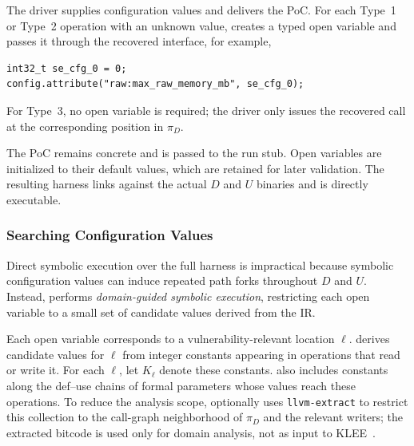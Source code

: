 The driver supplies configuration values and delivers the PoC. For each Type~1 or Type~2 operation with an unknown value, \sys creates a typed open variable and passes it through the recovered interface, for example,
\begin{verbatim}
int32_t se_cfg_0 = 0;
config.attribute("raw:max_raw_memory_mb", se_cfg_0);
\end{verbatim}

For Type~3, no open variable is required; the driver only issues the recovered call at the corresponding position in $\pi_D$. 

The PoC remains concrete and is
passed to the run stub. Open variables are initialized to their default values, which are retained for later validation. The resulting harness links against the actual $D$ and $U$ binaries and is directly executable.


\subsubsection{Searching Configuration Values}\label{subsubsec:confvalue}
Direct symbolic execution over the full harness is impractical because symbolic configuration values can induce repeated path forks throughout $D$ and $U$. Instead, \sys performs \textit{domain-guided symbolic execution}, restricting each open variable to a small set of candidate
values derived from the IR.

Each open variable corresponds to a vulnerability-relevant location $\ell$. \sys derives candidate values for $\ell$ from integer constants appearing in operations that read or write it. For each $\ell$, let $K_\ell$ denote these constants. \sys also includes constants along the def--use chains of formal parameters whose values reach these operations. To reduce the analysis scope, \sys optionally uses \texttt{llvm-extract} to restrict this collection to the call-graph neighborhood of $\pi_D$ and the relevant writers; the extracted bitcode is used only for domain analysis, not as input to KLEE~\cite{cadar2008klee}.


